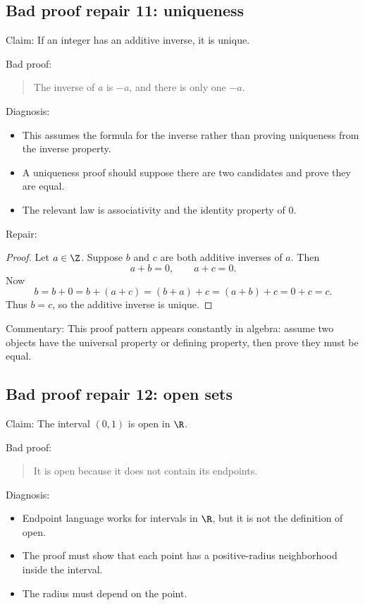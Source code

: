 \subsection{Bad proof repair 11: uniqueness}

Claim: If an integer has an additive inverse, it is unique.

Bad proof:

\begin{quote}
The inverse of $a$ is $-a$, and there is only one $-a$.
\end{quote}

Diagnosis:

\begin{itemize}
\item This assumes the formula for the inverse rather than proving uniqueness from the inverse property.
\item A uniqueness proof should suppose there are two candidates and prove they are equal.
\item The relevant law is associativity and the identity property of $0$.
\end{itemize}

Repair:

\begin{proof}
Let $a\in\Z$. Suppose $b$ and $c$ are both additive inverses of $a$. Then
\[
a+b=0,\qquad a+c=0.
\]
Now
\[
b=b+0=b+(a+c)=(b+a)+c=(a+b)+c=0+c=c.
\]
Thus $b=c$, so the additive inverse is unique.
\end{proof}

Commentary: This proof pattern appears constantly in algebra: assume two objects have the universal property or defining property, then prove they must be equal.

\subsection{Bad proof repair 12: open sets}

Claim: The interval $(0,1)$ is open in $\R$.

Bad proof:

\begin{quote}
It is open because it does not contain its endpoints.
\end{quote}

Diagnosis:

\begin{itemize}
\item Endpoint language works for intervals in $\R$, but it is not the definition of open.
\item The proof must show that each point has a positive-radius neighborhood inside the interval.
\item The radius must depend on the point.
\end{itemize}


